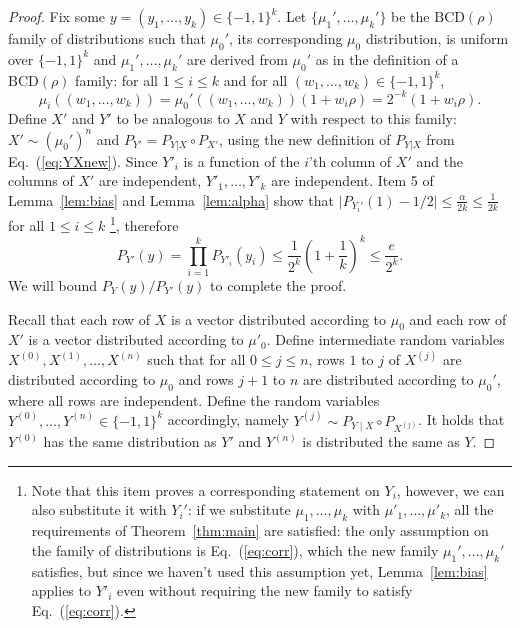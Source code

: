 \documentclass[final, 12pt]{colt2018}
\providecommand{\BCD}{\mathrm{BCD}}
\renewcommand{\eqref}[1]{Eq.~(\ref{#1})}
\newcommand{\lemref}[1]{Lemma~\ref{#1}}
\begin{document}
\begin{proof}
Fix some $y=(y_1, \dots, y_k) \in \{-1,1\}^k$. Let $\{ \mu_1', \dots, \mu_k'\}$ be the $\BCD(\rho)$ family of distributions such that $\mu_0'$, its corresponding $\mu_0$ distribution, is uniform over $\{-1,1\}^k$ and $\mu_1', \dots, \mu_k'$ are derived from $\mu_0'$ as in the definition of a $\BCD(\rho)$ family: for all $1\le i \le k$ and for all $(w_1,\dots, w_k)\in \{-1,1\}^k$, 
\[ \mu_i((w_1, \dots, w_k)) = \mu_0'((w_1,\dots,w_k)) (1+w_i \rho)
= 2^{-k} (1+w_i\rho). \]
Define $X'$ and $Y'$ to be analogous to $X$ and $Y$ with respect to this family: $X'\sim (\mu_0')^n$ and $P_{Y'} = P_{Y|X} \circ P_{X'}$, using the new definition of $P_{Y|X}$ from \eqref{eq:YXnew}. Since $Y'_i$ is a function of the $i$'th column of $X'$ and the columns of $X'$ are independent, $Y'_1, \dots, Y'_k$ are independent. Item 5 of Lemma~\ref{lem:bias} and \lemref{lem:alpha} show that $\lvert P_{Y_i'}(1) - 1/2 \rvert \le \frac{\alpha}{2k}\le \frac{1}{2k}$ for all $1 \le i \le k$ \footnote{Note that this item proves a corresponding statement on $Y_i$, however, we can also substitute it with $Y_i'$: if we substitute $\mu_1,\dots,\mu_k$ with $\mu'_1,\dots,\mu'_k$, all the requirements of Theorem~\ref{thm:main} are satisfied: the only assumption on the family of distributions  is \eqref{eq:corr}, which the new family $\mu_1',\dots,\mu_k'$ satisfies, but since we haven't used this assumption yet, Lemma~\ref{lem:bias} applies to $Y'_i$ even without requiring the new family to satisfy \eqref{eq:corr}.}, therefore
\begin{equation} \label{eq:521}
P_{Y'}(y) = \prod_{i=1}^k P_{Y'_i}(y_i)
\le \frac{1}{2^k}\left( 1 + \frac{1}{k} \right)^k
\le \frac{e}{2^k}.
\end{equation}
We will bound $P_Y(y) / P_{Y'}(y)$ to complete the proof.

Recall that each row of $X$ is a vector distributed according to $\mu_0$ and each row of  $X'$ is a vector distributed according to $\mu'_0$. Define intermediate random variables $X^{(0)}, X^{(1)}, \dots, X^{(n)}$ such that for all $0 \le j \le n$, rows $1$ to $j$ of $X^{(j)}$ are distributed according to $\mu_0$ and rows $j+1$ to $n$ are distributed according to $\mu_0'$, where all rows are independent. Define the random variables $Y^{(0)}, \dots, Y^{(n)} \in \{-1,1\}^k$ accordingly, namely $Y^{(j)} \sim P_{Y \mid X} \circ P_{X^{(j)}}$. It holds that $Y^{(0)}$ has the same distribution as $Y'$ and $Y^{(n)}$ is distributed the same as $Y$.


\end{proof}
\end{document}
